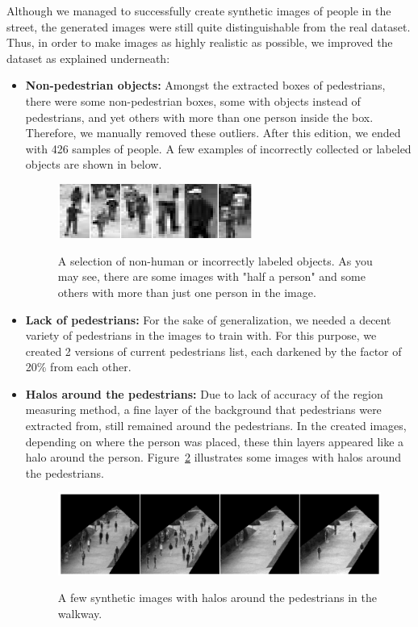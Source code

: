 Although we managed to successfully create synthetic images of people in the street, the generated images were still quite distinguishable from the real dataset. Thus, in order to make images as highly realistic as possible, we improved the dataset as explained underneath:
\begin{itemize}
\item \textbf{Non-pedestrian objects:} Amongst the extracted boxes of pedestrians, there were some non-pedestrian boxes, some with objects instead of pedestrians, and yet others with more than one person inside the box. Therefore, we manually removed these outliers. After this edition, we ended with 426 samples of people. A few examples of incorrectly collected or labeled objects are shown in below.

\begin{figure}[H]
	\centering
	{\includegraphics[width=0.6\textwidth]{images/nonped}}
	\caption{A selection of non-human or incorrectly labeled objects. As you may see, there are some images with "half a person" and some others with more than just one person in the image.}
	\label{fig:nonped}
\end{figure}
 
\item \textbf{Lack of pedestrians:} For the sake of generalization, we needed a decent variety of pedestrians in the images to train with. For this purpose, we created 2 versions of current pedestrians list, each darkened by the factor of 20\% from each other. 
\item \textbf{Halos around the pedestrians:} Due to lack of accuracy of the region measuring method, a fine layer of the background that pedestrians were extracted from, still remained around the pedestrians. In the created images, depending on where the person was placed, these thin layers appeared like a halo around the person. Figure~\ref{fig:haloim} illustrates some images with halos around the pedestrians. 
\begin{figure}[H]
	\centering
	{\includegraphics[width=1\textwidth]{images/halo}}
	\caption{A few synthetic images with halos around the pedestrians in the walkway.}
	\label{fig:haloim}
\end{figure}
 

\end{itemize}
